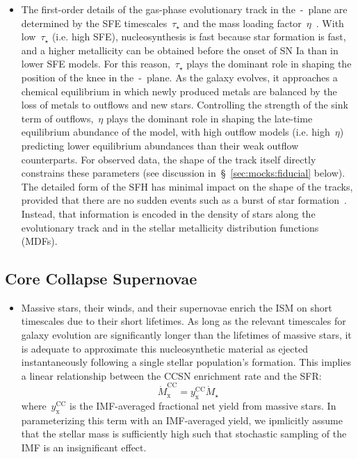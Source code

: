 \documentclass[ms.tex]{subfiles}
\begin{document}
\begin{itemize}
	\item The first-order details of the gas-phase evolutionary track in
	the~\afe-\feh~plane are determined by the SFE timescales~$\tau_\star$ and
	the mass loading factor~$\eta$~\citep{Weinberg2017}.
	With low~$\tau_\star$ (i.e. high SFE), nucleosynthesis is fast because
	star formation is fast, and a higher metallicity can be obtained before
	the onset of SN Ia than in lower SFE models.
	For this reason,~$\tau_\star$ plays the dominant role in shaping the
	position of the knee in the~\afe-\feh~plane.
	As the galaxy evolves, it approaches a chemical equilibrium in which
	newly produced metals are balanced by the loss of metals to outflows
	and new stars.
	Controlling the strength of the sink term of outflows,~$\eta$ plays
	the dominant role in shaping the late-time equilibrium abundance of the
	model, with high outflow models (i.e. high~$\eta$) predicting lower
	equilibrium abundances than their weak outflow counterparts.
	For observed data, the shape of the track itself directly constrains
	these parameters (see discussion in~\S~\ref{sec:mocks:fiducial} below).
	The detailed form of the SFH has minimal impact on the shape of the
	tracks, provided that there are no sudden events such as a burst of
	star formation~\citep{Weinberg2017, Johnson2020}.
	Instead, that information is encoded in the density of stars along the
	evolutionary track and in the stellar metallicity distribution functions
	(MDFs).


\end{itemize}

\subsection{Core Collapse Supernovae}
\label{sec:onezone:ccsne}

\begin{itemize}

	\item Massive stars, their winds, and their supernovae enrich the ISM on
	short timescales due to their short lifetimes.
	As long as the relevant timescales for galaxy evolution are significantly
	longer than the lifetimes of massive stars, it is adequate to approximate
	this nucleosynthetic material as ejected instantaneously following a single
	stellar population's formation.
	This implies a linear relationship between the CCSN enrichment rate and
	the SFR:
	\begin{equation}
	\label{eq:mdot_cc}
	\dot{M}_\text{x}^\text{CC} = y_\text{x}^\text{CC}\dot{M}_\star
	\end{equation}
	where~$y_\text{x}^\text{CC}$ is the IMF-averaged fractional net yield from
	massive stars.
	In parameterizing this term with an IMF-averaged yield, we ipmlicitly assume
	that the stellar mass is sufficiently high such that stochastic sampling of
	the IMF is an insignificant effect.

\end{itemize}
\end{document}
